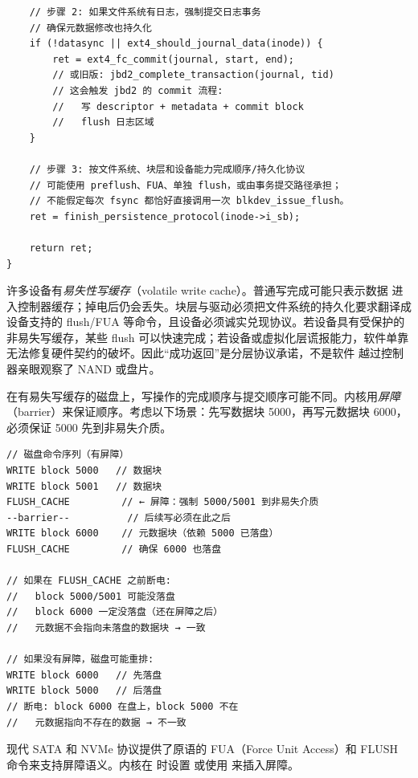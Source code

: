 \begin{filesystemlayout}
\begin{lstlisting}
    // 步骤 2: 如果文件系统有日志，强制提交日志事务
    // 确保元数据修改也持久化
    if (!datasync || ext4_should_journal_data(inode)) {
        ret = ext4_fc_commit(journal, start, end);
        // 或旧版: jbd2_complete_transaction(journal, tid)
        // 这会触发 jbd2 的 commit 流程:
        //   写 descriptor + metadata + commit block
        //   flush 日志区域
    }

    // 步骤 3: 按文件系统、块层和设备能力完成顺序/持久化协议
    // 可能使用 preflush、FUA、单独 flush，或由事务提交路径承担；
    // 不能假定每次 fsync 都恰好直接调用一次 blkdev_issue_flush。
    ret = finish_persistence_protocol(inode->i_sb);

    return ret;
}
\end{lstlisting}

\begin{warningbox}
许多设备有\emph{易失性写缓存}（volatile write cache）。普通写完成可能只表示数据
进入控制器缓存；掉电后仍会丢失。块层与驱动必须把文件系统的持久化要求翻译成
设备支持的 flush/FUA 等命令，且设备必须诚实兑现协议。若设备具有受保护的
非易失写缓存，某些 flush 可以快速完成；若设备或虚拟化层谎报能力，软件单靠
 无法修复硬件契约的破坏。因此“成功返回”是分层协议承诺，不是软件
越过控制器亲眼观察了 NAND 或盘片。
\end{warningbox}


在有易失写缓存的磁盘上，写操作的完成顺序与提交顺序可能不同。内核用\emph{屏障}（barrier）来保证顺序。考虑以下场景：先写数据块 5000，再写元数据块 6000，必须保证 5000 先到非易失介质。

\begin{lstlisting}
// 磁盘命令序列（有屏障）
WRITE block 5000   // 数据块
WRITE block 5001   // 数据块
FLUSH_CACHE         // ← 屏障：强制 5000/5001 到非易失介质
--barrier--          // 后续写必须在此之后
WRITE block 6000    // 元数据块（依赖 5000 已落盘）
FLUSH_CACHE         // 确保 6000 也落盘

// 如果在 FLUSH_CACHE 之前断电:
//   block 5000/5001 可能没落盘
//   block 6000 一定没落盘（还在屏障之后）
//   元数据不会指向未落盘的数据块 → 一致

// 如果没有屏障，磁盘可能重排:
WRITE block 6000   // 先落盘
WRITE block 5000   // 后落盘
// 断电: block 6000 在盘上，block 5000 不在
//   元数据指向不存在的数据 → 不一致
\end{lstlisting}

现代 SATA 和 NVMe 协议提供了原语的 FUA（Force Unit Access）和 FLUSH 命令来支持屏障语义。内核在  时设置  或使用  来插入屏障。


\end{filesystemlayout}
